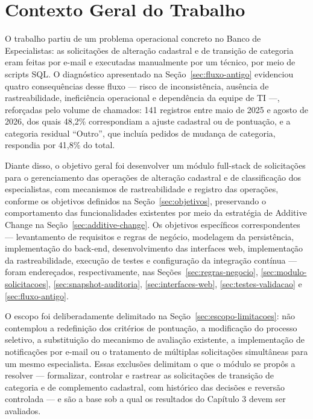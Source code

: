 \section{Contexto Geral do Trabalho}
\label{sec:contextoGeral}

O trabalho partiu de um problema operacional concreto no Banco de 
Especialistas: as solicitações de alteração cadastral e de transição 
de categoria eram feitas por e-mail e executadas manualmente por um 
técnico, por meio de scripts SQL. O diagnóstico apresentado na Seção~\ref{sec:fluxo-antigo} 
evidenciou quatro consequências desse fluxo — risco de inconsistência, 
ausência de rastreabilidade, ineficiência operacional e dependência da 
equipe de TI —, reforçadas pelo volume de chamados: 141 registros 
entre maio de 2025 e agosto de 2026, dos quais 48,2\% correspondiam a 
ajuste cadastral ou de pontuação, e a categoria residual “Outro”, que 
incluía pedidos de mudança de categoria, respondia por 41,8\% do total.

Diante disso, o objetivo geral foi desenvolver um módulo full-stack de 
solicitações para o gerenciamento das operações de alteração cadastral 
e de classificação dos especialistas, com mecanismos de rastreabilidade 
e registro das operações, conforme os objetivos definidos na Seção~\ref{sec:objetivos}, 
preservando o comportamento das funcionalidades existentes por meio da 
estratégia de Additive Change na Seção~\ref{sec:additive-change}. Os objetivos 
específicos correspondentes — levantamento de requisitos e regras de negócio, 
modelagem da persistência, implementação do back-end, desenvolvimento das 
interfaces web, implementação da rastreabilidade, execução de testes e 
configuração da integração contínua — foram endereçados, respectivamente, nas 
Seções~\ref{sec:regras-negocio}, \ref{sec:modulo-solicitacoes}, \ref{sec:snapshot-auditoria}, \ref{sec:interfaces-web}, \ref{sec:testes-validacao} e \ref{sec:fluxo-antigo}.

O escopo foi deliberadamente delimitado na Seção~\ref{sec:escopo-limitacoes}: não 
contemplou a redefinição dos critérios de pontuação, a modificação do processo 
seletivo, a substituição do mecanismo de avaliação existente, a implementação de 
notificações por e-mail ou o tratamento de múltiplas solicitações simultâneas para 
um mesmo especialista. Essas exclusões delimitam o que o módulo se propôs a 
resolver — formalizar, controlar e rastrear as solicitações de transição de 
categoria e de complemento cadastral, com histórico das decisões e reversão 
controlada — e são a base sob a qual os resultados do Capítulo 3 devem ser 
avaliados.